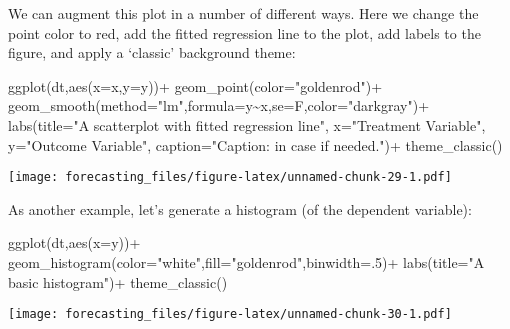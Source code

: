 \documentclass[
  oneside]{book}
\newenvironment{Shaded}{\begin{snugshade}}{\end{snugshade}}
\newcommand{\AttributeTok}[1]{\textcolor[rgb]{0.77,0.63,0.00}{#1}}
\newcommand{\DecValTok}[1]{\textcolor[rgb]{0.00,0.00,0.81}{#1}}
\newcommand{\FunctionTok}[1]{\textcolor[rgb]{0.00,0.00,0.00}{#1}}
\newcommand{\NormalTok}[1]{#1}
\newcommand{\SpecialCharTok}[1]{\textcolor[rgb]{0.00,0.00,0.00}{#1}}
\newcommand{\StringTok}[1]{\textcolor[rgb]{0.31,0.60,0.02}{#1}}
\begin{document}
We can augment this plot in a number of different ways. Here we change the point color to red, add the fitted regression line to the plot, add labels to the figure, and apply a `classic' background theme:

\begin{Shaded}
\begin{Highlighting}[]
\FunctionTok{ggplot}\NormalTok{(dt,}\FunctionTok{aes}\NormalTok{(}\AttributeTok{x=}\NormalTok{x,}\AttributeTok{y=}\NormalTok{y))}\SpecialCharTok{+}
  \FunctionTok{geom\_point}\NormalTok{(}\AttributeTok{color=}\StringTok{"goldenrod"}\NormalTok{)}\SpecialCharTok{+}
  \FunctionTok{geom\_smooth}\NormalTok{(}\AttributeTok{method=}\StringTok{"lm"}\NormalTok{,}\AttributeTok{formula=}\NormalTok{y}\SpecialCharTok{\textasciitilde{}}\NormalTok{x,}\AttributeTok{se=}\NormalTok{F,}\AttributeTok{color=}\StringTok{"darkgray"}\NormalTok{)}\SpecialCharTok{+}
  \FunctionTok{labs}\NormalTok{(}\AttributeTok{title=}\StringTok{"A scatterplot with fitted regression line"}\NormalTok{, }
       \AttributeTok{x=}\StringTok{"Treatment Variable"}\NormalTok{, }
       \AttributeTok{y=}\StringTok{"Outcome Variable"}\NormalTok{, }
       \AttributeTok{caption=}\StringTok{"Caption: in case if needed."}\NormalTok{)}\SpecialCharTok{+}
  \FunctionTok{theme\_classic}\NormalTok{()}
\end{Highlighting}
\end{Shaded}

\texttt{[image: forecasting\_files/figure-latex/unnamed-chunk-29-1.pdf]}

As another example, let's generate a histogram (of the dependent variable):

\begin{Shaded}
\begin{Highlighting}[]
\FunctionTok{ggplot}\NormalTok{(dt,}\FunctionTok{aes}\NormalTok{(}\AttributeTok{x=}\NormalTok{y))}\SpecialCharTok{+}
  \FunctionTok{geom\_histogram}\NormalTok{(}\AttributeTok{color=}\StringTok{"white"}\NormalTok{,}\AttributeTok{fill=}\StringTok{"goldenrod"}\NormalTok{,}\AttributeTok{binwidth=}\NormalTok{.}\DecValTok{5}\NormalTok{)}\SpecialCharTok{+}
  \FunctionTok{labs}\NormalTok{(}\AttributeTok{title=}\StringTok{"A basic histogram"}\NormalTok{)}\SpecialCharTok{+}
  \FunctionTok{theme\_classic}\NormalTok{()}
\end{Highlighting}
\end{Shaded}

\texttt{[image: forecasting\_files/figure-latex/unnamed-chunk-30-1.pdf]}
\end{document}

